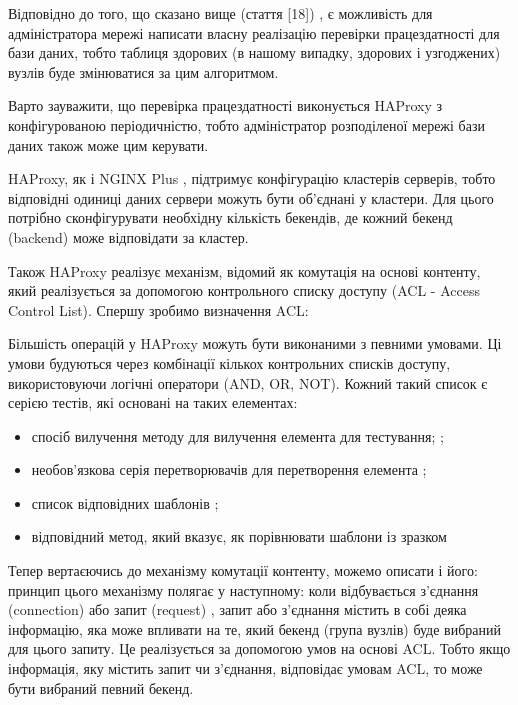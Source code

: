 \documentclass[14pt]{vakthesis}
\begin{document}
Відповідно до того, що сказано вище (стаття [18]) , є можливість для адміністратора мережі написати власну реалізацію перевірки працездатності для бази даних, тобто таблиця здорових (в нашому випадку, здорових і узгоджених) вузлів буде змінюватися за цим алгоритмом. 

Варто зауважити, що перевірка працездатності виконується HAProxy з конфігурованою періодичністю, 
тобто адміністратор розподіленої мережі бази даних також може цим керувати.


HAProxy, як і NGINX Plus , підтримує конфігурацію кластерів серверів, тобто відповідні одиниці даних сервери можуть бути об'єднані у кластери. 
Для цього потрібно сконфігурувати необхідну кількість бекендів, де кожний бекенд (backend) може відповідати за кластер. 

Також HAProxy реалізує механізм, відомий як комутація на основі контенту, який реалізується за 
допомогою контрольного списку доступу (ACL - Access Control List).
Спершу зробимо визначення ACL:

Більшість операцій у HAProxy можуть бути виконаними з певними умовами. Ці умови будуються через комбінації кількох контрольних списків доступу, використовуючи логічні оператори (AND, OR, NOT). Кожний такий список є серією тестів, які основані на таких елементах:

\begin{itemize}

\item спосіб вилучення методу для вилучення елемента для тестування; ;

\item необов'язкова серія перетворювачів для перетворення елемента ;

\item список відповідних шаблонів ;

\item відповідний метод, який вказує, як порівнювати шаблони із зразком

\end{itemize}

Тепер вертаєючись до механізму комутації контенту, можемо описати і його: принцип цього механізму полягає у наступному: 
коли відбувається з'єднання (connection) або запит (request) , запит або з'єднання містить в собі деяка інформацію, яка може впливати на те, який бекенд (група вузлів) буде вибраний для цього запиту. Це реалізується за допомогою умов на основі ACL. Тобто якщо інформація, яку містить запит чи з'єднання, відповідає умовам ACL, то може бути вибраний певний бекенд.
\end{document}
